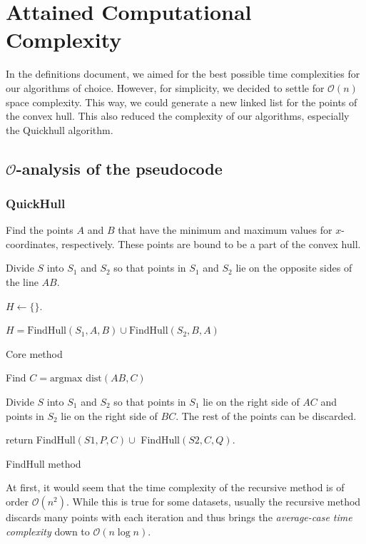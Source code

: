 \documentclass[a4paper,12pt,leqno,titlepage]{article}
\newcommand{\bigO}{\mathcal{O}}
\begin{document}
\pagebreak
\section{Attained Computational Complexity}
In the definitions document, we aimed for the best possible time complexities for our algorithms of choice.
However, for simplicity, we decided to settle for $\bigO(n)$ space complexity.
This way, we could generate a new linked list for the points of the convex hull.
This also reduced the complexity of our algorithms, especially the Quickhull algorithm.


\subsection{$\bigO$-analysis of the pseudocode}
\subsubsection{QuickHull}
\begin{algorithm}[H]
 \SetAlgoLined
{}


\BlankLine
Find the points $A$ and $B$ that have the minimum and maximum values for $x$-coordinates, respectively.
These points are bound to be a part of the convex hull.
 
Divide $S$ into $S_1$ and $S_2$ so that points in $S_1$ and $S_2$ lie on the opposite sides of the line $AB$.

$H \leftarrow \{\}$.

$H = \text{FindHull}(S_1,A,B) \cup \text{FindHull}(S_2,B,A)$ 
\BlankLine
 
\caption{Core method}
\end{algorithm}

\begin{algorithm}[H]
\SetAlgoLined
{}


\BlankLine
{}
Find $C = \text{argmax dist}(AB,C)$

Divide $S$ into $S_1$ and $S_2$ so that points in $S_1$ lie on the right side of $AC$ and points in $S_2$ lie on the right side of $BC$.
The rest of the points can be discarded.

return FindHull$(S1,P,C) \cup$ FindHull$(S2,C,Q)$.
\BlankLine
\caption{FindHull method}
\end{algorithm}
At first, it would seem that the time complexity of the recursive method is of order $\bigO(n^2)$.
While this is true for some datasets, usually the recursive method discards many points with each iteration and
thus brings the \emph{average-case time complexity} down to $\bigO(n\log n)$.
\end{document}
